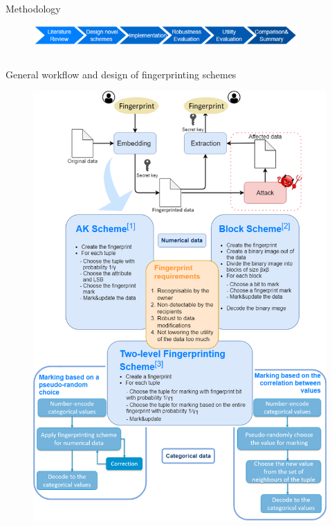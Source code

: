\documentclass[final,hyperref={pdfpagelabels=true}]{beamer}
\begin{document}
\begin{frame}
      \begin{block}{Methodology}
        \begin{figure}
            \centering
            \includegraphics[width=0.9\textwidth]{methodology.PNG}
        \end{figure}
      \end{block}
  \begin{columns}[t]
    \begin{column}{.45\textwidth}

      \begin{block}{General workflow and design of fingerprinting schemes}
            \begin{figure}
                \centering
                \includegraphics[width=\textwidth]{left-side.png}

\end{figure}
\end{block}
\end{column}
\end{columns}
\end{frame}
\end{document}
